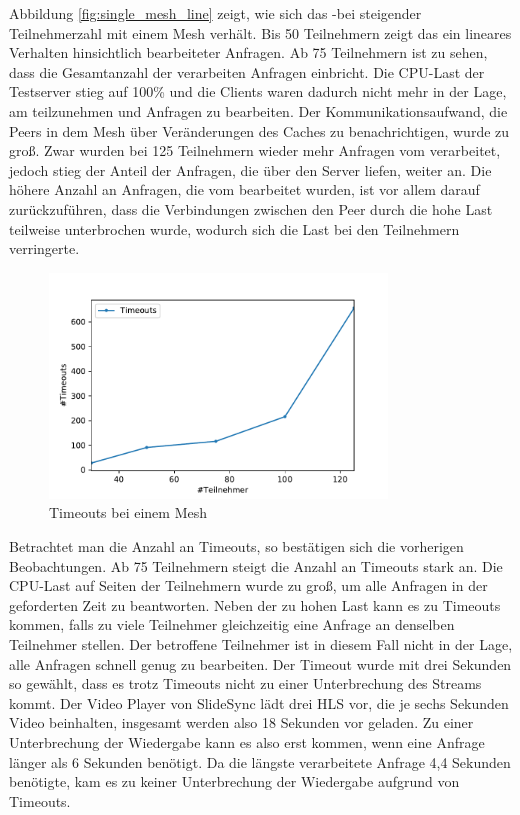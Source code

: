 Abbildung \ref{fig:single_mesh_line} zeigt, wie sich das \pTp-\cdn bei steigender Teilnehmerzahl mit einem Mesh verhält. Bis 50 Teilnehmern zeigt das \cdn ein lineares Verhalten hinsichtlich bearbeiteter Anfragen. Ab 75 Teilnehmern ist zu sehen, dass die Gesamtanzahl der verarbeiten Anfragen einbricht. Die CPU-Last der Testserver stieg auf 100\% und die Clients waren dadurch nicht mehr in der Lage, am \cdn teilzunehmen und Anfragen zu bearbeiten. Der Kommunikationsaufwand, die Peers in dem Mesh über Veränderungen des Caches zu benachrichtigen, wurde zu groß. Zwar wurden bei 125 Teilnehmern wieder mehr Anfragen vom \cdn verarbeitet, jedoch stieg der Anteil der Anfragen, die über den Server liefen, weiter an. Die höhere Anzahl an Anfragen, die vom \cdn bearbeitet wurden, ist vor allem darauf zurückzuführen, dass die Verbindungen zwischen den Peer durch die hohe Last teilweise unterbrochen wurde, wodurch sich die Last bei den Teilnehmern verringerte.   

\begin{figure}[!h]
	\centering
	\includegraphics[width=0.8\textwidth]{figures/timeouts_single}
	\caption[Timeouts bei einem Mesh]{Timeouts bei einem Mesh}
	\label{fig:timeouts_single}
\end{figure}

Betrachtet man die Anzahl an Timeouts, so bestätigen sich die vorherigen Beobachtungen. Ab 75 Teilnehmern steigt die Anzahl an Timeouts stark an. Die CPU-Last auf Seiten der Teilnehmern wurde zu groß, um alle Anfragen in der geforderten Zeit zu beantworten. Neben der zu hohen Last kann es zu Timeouts kommen, falls zu viele Teilnehmer gleichzeitig eine Anfrage an denselben Teilnehmer stellen. Der betroffene Teilnehmer ist in diesem Fall nicht in der Lage, alle Anfragen schnell genug zu bearbeiten. Der Timeout wurde mit drei Sekunden so gewählt, dass es trotz Timeouts nicht zu einer Unterbrechung des Streams kommt. Der Video Player von SlideSync lädt drei HLS vor, die je sechs Sekunden Video beinhalten, insgesamt werden also 18 Sekunden vor geladen. Zu einer Unterbrechung der Wiedergabe kann es also erst kommen, wenn eine Anfrage länger als 6 Sekunden benötigt. Da die längste verarbeitete Anfrage 4,4 Sekunden benötigte, kam es zu keiner Unterbrechung der Wiedergabe aufgrund von Timeouts.

